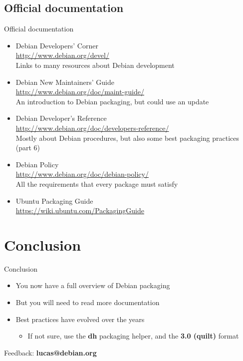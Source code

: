 \documentclass[10pt,final]{beamer}
\begin{document}
\subsection{Official documentation}
\begin{frame}{Official documentation}
	\begin{itemize}
		\item Debian Developers' Corner\\
			\url{http://www.debian.org/devel/}\\
			{\small Links to many resources about Debian development}
			\br
		\item Debian New Maintainers' Guide\\
			\url{http://www.debian.org/doc/maint-guide/}\\
			{\small An introduction to Debian packaging, but could use an update}
			\br
		\item Debian Developer's Reference\\
		      \url{http://www.debian.org/doc/developers-reference/}\\
		      {\small Mostly about Debian procedures, but also some best packaging practices (part 6)}
			\br
	      \item Debian Policy\\
		    \url{http://www.debian.org/doc/debian-policy/}\\
		    {\small All the requirements that every package must satisfy}
			\br

		\item Ubuntu Packaging Guide\\
			\url{https://wiki.ubuntu.com/PackagingGuide}
	\end{itemize}
\end{frame}

\section{Conclusion}
\begin{frame}{Conclusion}
\begin{itemize}
	\item You now have a full overview of Debian packaging
		\br
	\item But you will need to read more documentation
		\br
	\item Best practices have evolved over the years
		\begin{itemize}
			\item If not sure, use the \textbf{dh} packaging helper, and the \textbf{3.0 (quilt)} format
		\end{itemize}
\end{itemize}
\vfill
\centerline{\large Feedback: \textbf{lucas@debian.org}}
\end{frame}
\end{document}
